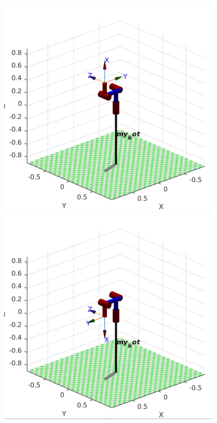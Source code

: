 \documentclass{article}
\begin{document}
\begin{center}
\begin{figure}[!htb]
   \begin{minipage}{0.33\textwidth}
     \centering
     \includegraphics[width=\linewidth]{images/frame3_q2_0_q3_90.png}
   \end{minipage}\hfill
   \begin{minipage}{0.33\textwidth}
     \centering
     \includegraphics[width=\linewidth]{images/frame3_q2_0_q3_-90.png}

\end{minipage}
\end{figure}
\end{center}
\end{document}
